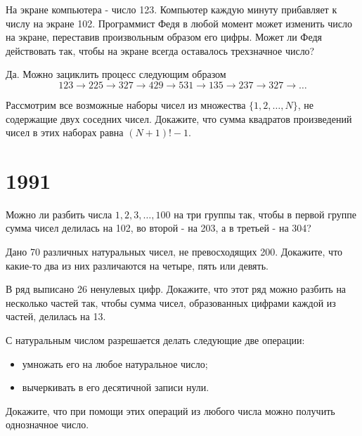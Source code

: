 \documentclass[11pt, a4paper]{problems_template}
\begin{document}
\begin{exercise}[9]
На экране компьютера - число 123. Компьютер каждую минуту прибавляет к числу на экране 102. Программист Федя в любой момент может изменить число на экране, переставив произвольным образом его цифры. Может ли Федя действовать так, чтобы на экране всегда оставалось трехзначное число?
\end{exercise}

\begin{Solution}
Да. Можно зациклить процесс следующим образом
$$
123 \rightarrow 225 \rightarrow 327 \rightarrow 429 \rightarrow 531 \rightarrow 135 \rightarrow 237 \rightarrow 327 \rightarrow \dots 
$$
\end{Solution}

\begin{exercise}[46]
Рассмотрим все возможные наборы чисел из множества $\{1, 2, \dots, N\}$, не содержащие двух соседних чисел. Докажите, что сумма квадратов произведений чисел в этих наборах равна $(N + 1)! - 1$.
\end{exercise}

\chapter{1991}

\begin{exercise}[36]
Можно ли разбить числа $1, 2, 3, \dots, 100$ на три группы так, чтобы в первой группе сумма чисел делилась на 102, во второй - на 203, а в третьей - на 304?
\end{exercise}

\begin{exercise}[42]
Дано 70 различных натуральных чисел, не превосходящих 200. Докажите, что какие-то два из них различаются на четыре, пять или девять.
\end{exercise}

\begin{Solution}

\end{Solution}

\begin{exercise}[47]
В ряд выписано 26 ненулевых цифр. Докажите, что этот ряд можно разбить на несколько частей так, чтобы сумма чисел, образованных цифрами каждой из частей, делилась на 13.
\end{exercise}

\begin{exercise}[53]
С натуральным числом разрешается делать следующие две операции:
\begin{itemize}
\item умножать его на любое натуральное число;
\item вычеркивать в его десятичной записи нули.
\end{itemize}
Докажите, что при помощи этих операций из любого числа можно получить однозначное число.
\end{exercise}
\end{document}

